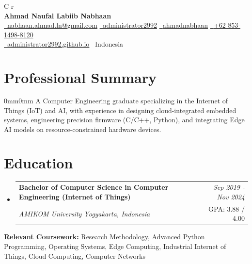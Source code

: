 \documentclass[a4paper,11pt]{article}
\makeatletter
\newcommand{\resumeSubheading}[4]{
\vspace{0.5mm}\item
    \begin{tabular*}{0.98\textwidth}[t]{l@{\extracolsep{\fill}}r}
        \textbf{#1} & \textit{\footnotesize{#4}} \\
        \textit{\footnotesize{#3}} &  \footnotesize{#2}\\
    \end{tabular*}
    \vspace{-2.4mm}
}
\newcommand{\resumeSubHeadingListStart}{\begin{itemize}[leftmargin=*,labelsep=0mm]}
\newcommand{\resumeSubHeadingListEnd}{\end{itemize}\vspace{2mm}}
\newcommand{\name}{Ahmad Naufal Labiib Nabhaan} %
\newcommand{\phone}{+62 853-1498-8120} %
\newcommand{\emaila}{nabhaan.ahmad.ln@gmail.com} %
\newcommand{\myweb}{https://administrator2992.github.io}
\newcommand{\myloc}{Indonesia}
\makeatother
\begin{document}
\selectfont

{
\begin{center}
\begin{tabularx}{\linewidth}{C r} %
  \\
  \textbf{\Huge \name} \\ %
  \href{mailto:\emaila}{\raisebox{0.0\height}{\footnotesize \faEnvelope}\ {\emaila}} \href{https://github.com/administrator2992}{\raisebox{0.0\height}{\footnotesize \faGithub}\ {administrator2992}} \href{https://linkedin.com/in/ahmadnabhaan/}{\raisebox{0.0\height}{\footnotesize \faLinkedin}\ {ahmadnabhaan}} \href{tel:\phone}{\raisebox{0.0\height}{\footnotesize \faPhone}\ {\phone}} \\
  \href{\myweb}{\raisebox{0.0\height}{\footnotesize \faGlobe}\ {administrator2992.github.io}} \raisebox{0.0\height}{\footnotesize \faMapMarker}\ {\myloc}
\end{tabularx}
\end{center}

}

\section{\textbf{Professional Summary}}
\vspace{2.5mm}
\begin{adjustwidth}{0mm}{0mm}
  \justifying  %
  \setlength{\parindent}{0pt}  %
  \setlength{\parskip}{2pt}    %
    A Computer Engineering graduate specializing in the Internet of Things (IoT) and AI, with experience in designing cloud-integrated embedded systems, engineering precision firmware (C/C++, Python), and integrating Edge AI models on resource-constrained hardware devices.
  \end{adjustwidth}
\vspace{-2.5mm}

\section{\textbf{Education}}
  \resumeSubHeadingListStart
    \resumeSubheading
      {Bachelor of Computer Science in Computer Engineering (Internet of Things)}{GPA: 3.88 / 4.00}
      {AMIKOM University Yogyakarta, Indonesia}{Sep 2019 - Nov 2024} 
  \resumeSubHeadingListEnd
  \textbf{Relevant Coursework:}
  Research Methodology, Advanced Python Programming, Operating Systems, Edge Computing, Industrial Internet of Things, Cloud Computing, Computer Networks
\vspace{-2.5mm}
\end{document}
